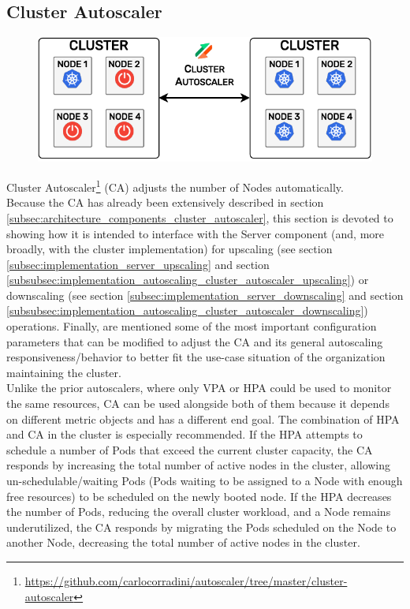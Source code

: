 \subsection{Cluster Autoscaler}
\label{subsec:implementation_autoscaling_cluster_autoscaler}

\begin{figure}
  \centering
  \includegraphics[width=\linewidth]{
    images/implementation/cluster_autoscaler.pdf
  }
\end{figure}

Cluster Autoscaler\footnote{\url{https://github.com/carlocorradini/autoscaler/tree/master/cluster-autoscaler}}
(CA) adjusts the number of Nodes automatically. \\ %

Because the CA has already been extensively described in section \ref{subsec:architecture_components_cluster_autoscaler},
this section is devoted to showing how it is intended to interface with the
Server component (and, more broadly, with the cluster implementation) for
upscaling (see section \ref{subsec:implementation_server_upscaling} and section \ref{subsubsec:implementation_autoscaling_cluster_autoscaler_upscaling})
or downscaling (see section \ref{subsec:implementation_server_downscaling} and section
\ref{subsubsec:implementation_autoscaling_cluster_autoscaler_downscaling})
operations. Finally, are mentioned some of the most important configuration
parameters that can be modified to adjust the CA and its general autoscaling
responsiveness/behavior to better fit the use-case situation of the organization
maintaining the cluster. \\ %
Unlike the prior autoscalers, where only VPA or HPA could be used to monitor the
same resources, CA can be used alongside both of them because it depends on
different metric objects and has a different end goal. The combination of HPA and
CA in the cluster is especially recommended. If the HPA attempts to schedule a
number of Pods that exceed the current cluster capacity, the CA responds by increasing
the total number of active nodes in the cluster, allowing un-schedulable/waiting
Pods (Pods waiting to be assigned to a Node with enough free resources) to be
scheduled on the newly booted node. If the HPA decreases the number of Pods,
reducing the overall cluster workload, and a Node remains underutilized, the CA
responds by migrating the Pods scheduled on the Node to another Node, decreasing
the total number of active nodes in the cluster\cite{hpa_ca}.

